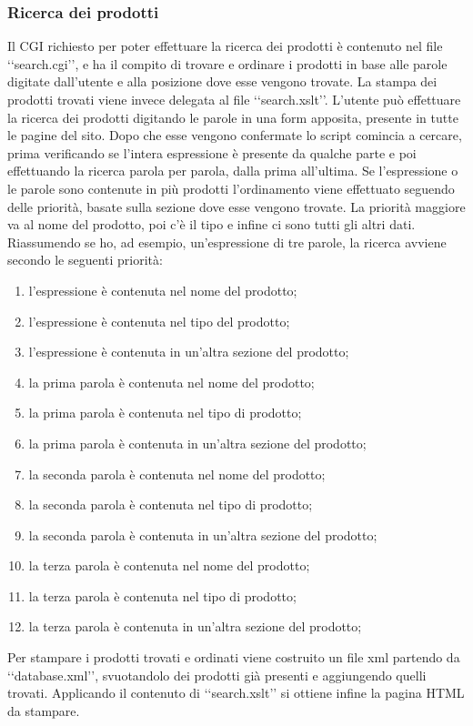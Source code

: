 {{		\subsubsection{Ricerca dei prodotti}
			Il CGI richiesto per poter effettuare la ricerca dei prodotti è contenuto nel file ‘‘search.cgi’’, e ha il compito di trovare e ordinare i prodotti in base alle parole digitate dall'utente e alla posizione dove esse vengono trovate. La stampa dei prodotti trovati viene invece delegata al file ‘‘search.xslt’’.
			L'utente può effettuare la ricerca dei prodotti digitando le parole in una form apposita, presente in tutte le pagine del sito. Dopo che esse vengono confermate lo script comincia a cercare, prima verificando se l'intera espressione è presente da qualche parte e poi effettuando la ricerca parola per parola, dalla prima all'ultima. Se l'espressione o le parole sono contenute in più prodotti l'ordinamento viene effettuato seguendo delle priorità, basate sulla sezione dove esse vengono trovate. La priorità maggiore va al nome del prodotto, poi c'è il tipo e infine ci sono tutti gli altri dati.
			Riassumendo se ho, ad esempio, un'espressione di tre parole, la ricerca avviene secondo le seguenti priorità:
			\begin{enumerate}
				\item l'espressione è contenuta nel nome del prodotto;
				\item l'espressione è contenuta nel tipo del prodotto;
				\item l'espressione è contenuta in un'altra sezione del prodotto;
				\item la prima parola è contenuta nel nome del prodotto;
				\item la prima parola è contenuta nel tipo di prodotto;
				\item la prima parola è contenuta in un'altra sezione del prodotto;
				\item la seconda parola è contenuta nel nome del prodotto;
				\item la seconda parola è contenuta nel tipo di prodotto;
				\item la seconda parola è contenuta in un'altra sezione del prodotto;
				\item la terza parola è contenuta nel nome del prodotto;
				\item la terza parola è contenuta nel tipo di prodotto;
				\item la terza parola è contenuta in un'altra sezione del prodotto;
			\end{enumerate}
			Per stampare i prodotti trovati e ordinati viene costruito un file xml partendo da ‘‘database.xml’’, svuotandolo dei prodotti già presenti e aggiungendo quelli trovati. Applicando il contenuto di ‘‘search.xslt’’ si ottiene infine la pagina HTML da stampare.
}}
